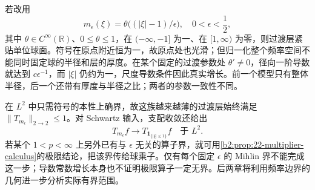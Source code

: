 \ProseParagraphBreak

若改用
\[
 m_\epsilon(\xi)=\theta\bigl((|\xi|-1)/\epsilon\bigr),
 \quad0<\epsilon<\frac12,
\]
其中 \(\theta\in C^\infty(\mathbb R)\)、\(0\leq\theta\leq1\)，在
\((-\infty,-1]\) 为一、在 \([1,\infty)\) 为零，则过渡层紧贴单位球面。符号在原点附近恒为一，故原点处也光滑；但归一化整个频率空间不能同时固定球的半径和层的厚度。在某个固定的过渡参数处 \(\theta'\neq0\)，径向一阶导数就达到
\(c\epsilon^{-1}\)，而 \(|\xi|\) 仍约为一，尺度导数条件因此真实增长。前一个模型只有整体半径，后一个还带有厚度与半径之比；两者的参数一致性不同。

\ProseParagraphBreak

在 \(L^2\) 中只需符号的本性上确界，故这族越来越薄的过渡层始终满足
\(\|T_{m_\epsilon}\|_{2\to2}\leq1\)。对 Schwartz 输入，支配收敛还给出
\[
 T_{m_\epsilon}f\longrightarrow
 T_{\mathbf1_{\{|\xi|\leq1\}}}f\quad\text{于 }L^2.
\]
若某个 \(1<p<\infty\) 上另外已有与 \(\epsilon\) 无关的算子界，就可用\cref{b2:prop:22-multiplier-calculus}的极限结论，把该界传给球乘子。仅有每个固定 \(\epsilon\) 的 Mihlin 界不能完成这一步；导数常数增长本身也不证明极限算子一定无界。后两章将利用频率边界的几何进一步分析实际有界范围。
